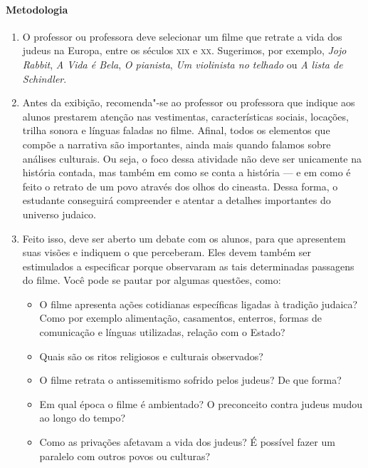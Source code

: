 \documentclass[12pt]{extarticle}
\begin{document}
\paragraph{Metodologia}

\begin{enumerate}
\item O professor ou professora deve selecionar um filme que retrate 
a vida dos judeus na Europa, entre os séculos \textsc{xix} e \textsc{xx}. 
Sugerimos, por exemplo,
\emph{Jojo Rabbit}, \emph{A Vida é Bela}, \emph{O pianista}, 
\emph{Um violinista no telhado} ou \emph{A lista de Schindler}. 

\item Antes da exibição, recomenda"-se ao
professor ou professora que indique aos alunos prestarem atenção nas 
vestimentas, características sociais, locações, trilha sonora e línguas 
faladas no filme. 
Afinal, todos os elementos que compõe a narrativa são importantes, 
ainda mais quando falamos sobre análises culturais. Ou seja, o foco 
dessa atividade não deve ser unicamente na
história contada, mas também em como se conta a história --- e em como é feito 
o retrato de um povo através dos olhos do cineasta. Dessa forma, o estudante
conseguirá compreender e atentar a detalhes importantes do universo judaico.

\item Feito isso, deve ser aberto um debate com os alunos, para que
apresentem suas visões e indiquem o que perceberam. Eles devem também ser
estimulados a especificar porque observaram as tais determinadas
passagens do filme. Você pode se pautar por algumas questões, como:

\begin{itemize}
\item O filme apresenta ações cotidianas específicas ligadas à tradição judaica? 
Como por exemplo alimentação, casamentos, enterros, formas de comunicação e 
línguas utilizadas, relação com o Estado?
\item Quais são os ritos religiosos e culturais observados?
\item O filme retrata o antissemitismo sofrido pelos judeus? De que forma?
\item Em qual época o filme é ambientado? O preconceito contra judeus 
mudou ao longo do tempo?
\item Como as privações afetavam a vida dos judeus? É possível fazer um 
paralelo com outros povos ou culturas?
\end{itemize}
\end{enumerate}
\end{document}

